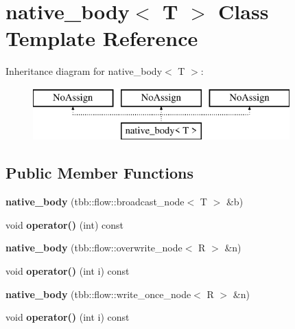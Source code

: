 \hypertarget{classnative__body}{}\section{native\+\_\+body$<$ T $>$ Class Template Reference}
\label{classnative__body}
Inheritance diagram for native\+\_\+body$<$ T $>$\+:\begin{figure}[H]
\begin{center}
\leavevmode
\includegraphics[height=2.000000cm]{classnative__body}
\end{center}
\end{figure}
\subsection*{Public Member Functions}
\begin{DoxyCompactItemize}
\item 
\hypertarget{classnative__body_ad540b7bdc7da6bca88dc20b897e31737}{}{\bfseries native\+\_\+body} (tbb\+::flow\+::broadcast\+\_\+node$<$ T $>$ \&b)\label{classnative__body_ad540b7bdc7da6bca88dc20b897e31737}

\item 
\hypertarget{classnative__body_ab6280162647d16886be3cd820cf37ae5}{}void {\bfseries operator()} (int) const \label{classnative__body_ab6280162647d16886be3cd820cf37ae5}

\item 
\hypertarget{classnative__body_a88bde215b3a441c0fe0bfb634af1ec99}{}{\bfseries native\+\_\+body} (tbb\+::flow\+::overwrite\+\_\+node$<$ R $>$ \&n)\label{classnative__body_a88bde215b3a441c0fe0bfb634af1ec99}

\item 
\hypertarget{classnative__body_a7d5efa509a6a3bd8e0d028857c9009cf}{}void {\bfseries operator()} (int i) const \label{classnative__body_a7d5efa509a6a3bd8e0d028857c9009cf}

\item 
\hypertarget{classnative__body_a5881347e0dc8445fc21e3e9beb97e85a}{}{\bfseries native\+\_\+body} (tbb\+::flow\+::write\+\_\+once\+\_\+node$<$ R $>$ \&n)\label{classnative__body_a5881347e0dc8445fc21e3e9beb97e85a}

\item 
\hypertarget{classnative__body_a7d5efa509a6a3bd8e0d028857c9009cf}{}void {\bfseries operator()} (int i) const \label{classnative__body_a7d5efa509a6a3bd8e0d028857c9009cf}

\end{DoxyCompactItemize}


